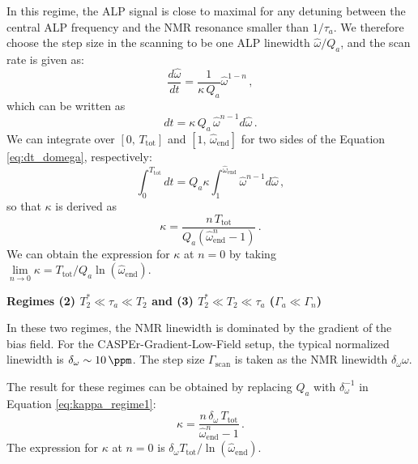 In this regime, the ALP signal is close to maximal for any detuning between the central ALP frequency and the NMR resonance smaller than $1/\tau_a$.
We therefore choose the step size in the scanning to be one ALP linewidth $\hat{\omega}/Q_a$, 
and the scan rate is given as:
\begin{equation}
    \dfrac{d\hat{\omega}}{dt} = \dfrac{1}{\kappa\,Q_a} \hat{\omega}^{1-n}
    \,,\label{eq:scan_rate_regime1}
\end{equation}
which can be written as
\begin{equation}
    dt = \kappa\,Q_a\, \hat{\omega}^{n-1} d\hat{\omega}
    \,.\label{eq:dt_domega}
\end{equation}
We can integrate over $[0,\,T_{\mathrm{tot}}]$ and $[1,\,\hat{\omega}_{\mathrm{end}}]$ for two sides of the Equation \eqref{eq:dt_domega}, respectively:
\begin{equation}
    \int_{0}^{T_{\mathrm{tot}}} dt = Q_a \kappa 
    \int_{1}^{\hat{\omega}_{\text{end}}} \hat{\omega}^{n-1} d\hat{\omega}
    \,,
\end{equation}
so that $\kappa$ is derived as
\begin{equation}
    \kappa = \dfrac{n\,T_{\mathrm{tot}} }{ Q_a(\hat{\omega}_{\mathrm{end}}^{n}-1 )}  
    \,.\label{eq:kappa_regime1}
\end{equation}
We can obtain the expression for $\kappa$ at $n=0$ by taking $\lim\limits_{n\to0}\kappa = T_{\mathrm{tot}}/Q_a \ln(\hat{\omega}_{\mathrm{end}})$. 




\textbf{Regimes (2) $T_2^* \ll \tau_a \ll T_2 $ and (3) $T_2^* \ll T_2 \ll \tau_a$ ($\Gamma_a\ll\Gamma_n$)}


In these two regimes, the NMR linewidth is dominated by the gradient of the bias field. 
For the CASPEr-Gradient-Low-Field setup, the typical normalized linewidth is $\delta_{\omega}\sim \SI{10}{\ppm}$. The step size $\Gamma_{\mathrm{scan}}$ is taken as the NMR linewidth $\delta_{\omega} \omega$.


The result for these regimes can be obtained by replacing $Q_a$ with $\delta_\omega^{-1}$ in Equation \eqref{eq:kappa_regime1}:
\begin{equation}
    \kappa = \dfrac{n \,\delta_\omega\,T_{\mathrm{tot}} }{ \hat{\omega}_{\mathrm{end}}^{n}-1 }
    \,.\label{eq:kappa_regime2and3}
\end{equation}
The expression for $\kappa$ at $n=0$ is $\delta_\omega T_{\mathrm{tot}} / \ln(\hat{\omega}_{\mathrm{end}})$. 



